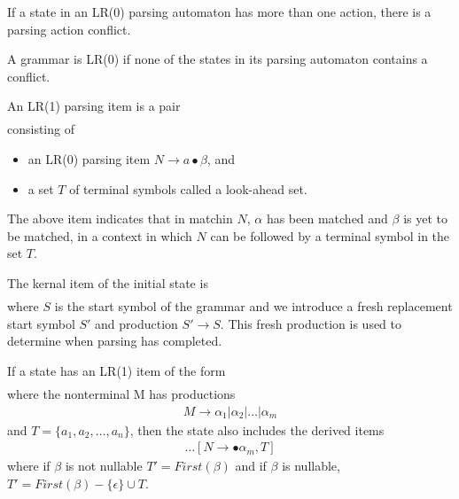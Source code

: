 If a state in an LR(0) parsing automaton has more than one action, 
there is a parsing action conflict.

A grammar is LR(0) if none of the states in its parsing 
automaton contains a conflict.

An LR(1) parsing item is a pair
\begin{align*}
    [N \rightarrow \alpha \bullet \beta, T]
\end{align*}
consisting of
\begin{itemize}
    \item an LR(0) parsing item $N \rightarrow a \bullet \beta$, and
    \item a set $T$ of terminal symbols called a look-ahead set.
\end{itemize}
The above item indicates that in matchin $N$, $\alpha$ has been matched and $\beta$ is yet 
to be matched, in a context in which $N$ can be followed by a terminal symbol in the set $T$.

The kernal item of the initial state is
\begin{align*}
    [S' \rightarrow \bullet S, \$]
\end{align*}
where $S$ is the start symbol of the grammar and we introduce a fresh replacement start 
symbol $S'$ and production $S' \rightarrow S$. This fresh production is used to determine 
when parsing has completed.

If a state has an LR(1) item of the form
\begin{align*}
    [N \rightarrow \alpha \bullet M \beta, T]
\end{align*}
where the nonterminal M has productions
\begin{align*}
    M \rightarrow \alpha_1 | \alpha_2 | \dots | \alpha_m
\end{align*}
and $T = \{a_1, a_2, \dots, a_n\}$, then the state also includes the derived items
\begin{align*}
    [N \rightarrow \bullet \alpha_1, T]
    \dots
    [N \rightarrow \bullet \alpha_m, T]
\end{align*}
where if $\beta$ is not nullable $T' = First(\beta)$ and if $\beta$ is nullable, 
$T' = First(\beta) - \{\epsilon\} \cup T$.

